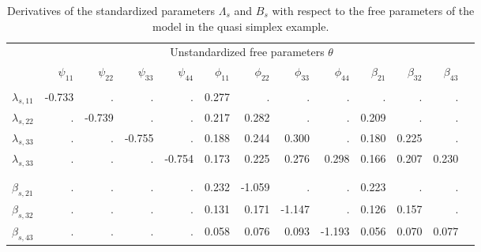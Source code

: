 \documentclass[a4paper, 11pt]{article}
\renewcommand{\vec}{\mathrm{vec}\,}
\newcommand{\0}{\boldsymbol{0}}
\begin{document}
\begin{table}
\begin{tabular}{lrrrrrrrrrrrr}\hline\hline
	& \multicolumn{11}{c}{Unstandardized free parameters $\theta$}\\
			& $\psi_{11}$ & $\psi_{22}$ &$\psi_{33}$ &$\psi_{44}$
			& $\phi_{11}$ & $\phi_{22}$ &$\phi_{33}$ &$\phi_{44}$ 
			& $\beta_{21}$ & $\beta_{32}$ &$\beta_{43}$
			\\
\hline
                   \\                                                      
$\lambda_{s, 11}$ &-0.733  & .      & .      & .     & 0.277 & .     & .     & .     & .     & .     & .   & \\
$\lambda_{s, 22}$&.     & -0.739  & .      & .     & 0.217 & 0.282 & .     & .     & 0.209 & .     & .   & \\
$\lambda_{s, 33}$&.      & .     & -0.755  & .     & 0.188 & 0.244 & 0.300 & .     & 0.180 & 0.225 & .   & \\
$\lambda_{s, 33}$&.      & .      & .     & -0.754 & 0.173 & 0.225 & 0.276 & 0.298 & 0.166 & 0.207 & 0.230\\
\\
             \\                                            
$\beta_{s, 21}$ &. & . & . & . & 0.232 & -1.059  & .      & .     & 0.223 & .     & .    & \\
$\beta_{s, 32}$&. & . & . & . & 0.131  & 0.171 & -1.147  & .     & 0.126 & 0.157 & .    & \\
$\beta_{s, 43}$&. & . & . & . & 0.058  & 0.076  & 0.093 & -1.193 & 0.056 & 0.070 & 0.077\\
\hline\hline
\end{tabular}
\caption{Derivatives of the standardized parameters $\Lambda_s$ and $B_s$ with respect
to the free parameters of the model in the quasi simplex example.}
\label{tab:jacobian}
\end{table}
\end{document}
